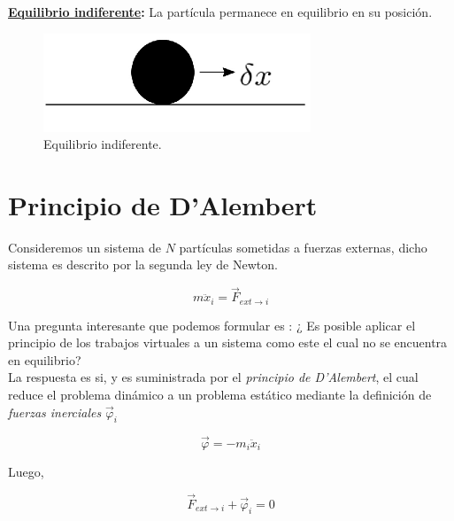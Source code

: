 \documentclass[12pt]{report}
\begin{document}
\textbf{\underline{Equilibrio indiferente}:} La partícula permanece en equilibrio en su posición.


\begin{figure}[H]
	\begin{center}
	\includegraphics[width=8cm]{figura30.png} 
	\caption{ Equilibrio indiferente.}
	\label{fig.1}
	\end{center}
\end{figure} 






















\section{Principio de D’Alembert}


Consideremos un sistema de $N$ partículas sometidas a fuerzas externas, dicho sistema es descrito por la segunda ley de Newton.

\begin{equation}
m \ddot{x}_i = \vec{F}_{ext \rightarrow i}
\end{equation}

Una pregunta interesante que podemos formular es : ¿ Es posible aplicar el principio de los trabajos virtuales a un sistema como este el cual no se encuentra en equilibrio? \\	


La respuesta es si, y es suministrada por el \textit{principio de D’Alembert}, el cual reduce el problema dinámico  a un problema estático  mediante la definición de \textit{fuerzas inerciales} $\vec{\varphi}_i$

\begin{equation}
\vec{\varphi}= -m_i\ddot{x}_i
\end{equation}


Luego,

\begin{equation}
\vec{F}_{ext \rightarrow i} + \vec{\varphi}_i =0
\end{equation}
\end{document}
